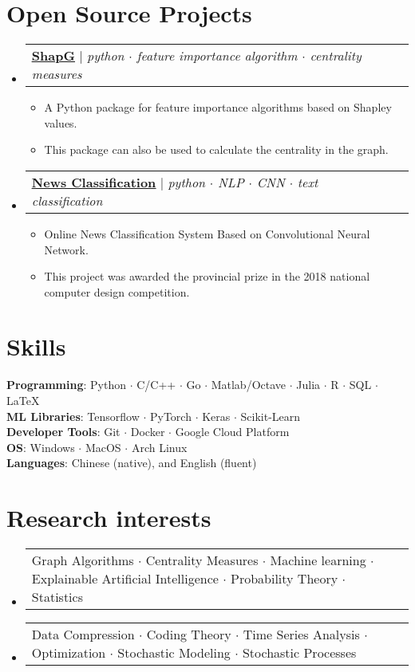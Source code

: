 \documentclass[letterpaper,10pt]{article}
\makeatletter
\newcommand{\link}[2]{\href{#1}{\color{blue}\underline{#2}}}
\newcommand{\resumeItem}[1]{
  \item\small{
    {#1 \vspace{-2pt}}
  }
}
\newcommand{\resumeProjectHeading}[2]{
  \item
  \begin{tabular*}{0.97\textwidth}{l@{\extracolsep{\fill}}r}
    \small#1 & #2 \\
  \end{tabular*}\vspace{-7pt}
}
\newenvironment{resumeSubHeadingList}{\begin{itemize}[leftmargin=0.15in, label={}]}{\end{itemize}}
\newenvironment{resumeItemList}{\begin{itemize}}{\end{itemize}}
\makeatother
\begin{document}
\section{Open Source Projects}
\begin{resumeSubHeadingList}

  \resumeProjectHeading{
    \link{https://github.com/vectorsss/shapG}{\textbf{ShapG}} $|$
    \emph{python $\cdot$ feature importance algorithm $\cdot$ centrality measures}}{}
  \begin{resumeItemList}
    \resumeItem{A Python package for feature importance algorithms based on Shapley values.}
    \resumeItem{This package can also be used to calculate the centrality in the graph.}
  \end{resumeItemList}

  \resumeProjectHeading{
    \link{https://github.com/vectorsss/news_classification}{\textbf{News Classification}} $|$
    \emph{python $\cdot$ NLP $\cdot$ CNN $\cdot$ text classification}}{}
  \begin{resumeItemList}
    \resumeItem{Online News Classification System Based on Convolutional Neural Network.}
    \resumeItem{This project was awarded the provincial  prize in the 2018 national computer design competition.}
  \end{resumeItemList}
\end{resumeSubHeadingList}

\section{Skills}
\begin{itemize}[leftmargin=0.15in, label={}]
  \small{\item{
        \textbf{Programming}{: Python $\cdot$ C/C++ $\cdot$ Go $\cdot$ Matlab/Octave $\cdot$ Julia $\cdot$ R $\cdot$ SQL $\cdot$ \LaTeX} \\
        \textbf{ML Libraries}{: Tensorflow $\cdot$  PyTorch $\cdot$ Keras $\cdot$  Scikit-Learn} \\
        \textbf{Developer Tools}{: Git $\cdot$ Docker $\cdot$  Google Cloud Platform} \\
        \textbf{OS}{: Windows $\cdot$ MacOS $\cdot$ Arch Linux} \\
        \textbf{Languages}{: Chinese (native), and English (fluent)}
        }}
\end{itemize}

\section{Research interests}
\begin{resumeSubHeadingList}
  \resumeProjectHeading{
    Graph Algorithms $\cdot$ Centrality Measures $\cdot$ Machine learning $\cdot$ Explainable Artificial Intelligence $\cdot$ Probability Theory $\cdot$ Statistics}{}
  \resumeProjectHeading{
    Data Compression $\cdot$ Coding Theory $\cdot$ Time Series Analysis $\cdot$ Optimization $\cdot$ Stochastic Modeling $\cdot$ Stochastic Processes}{}
\end{resumeSubHeadingList}
\end{document}
